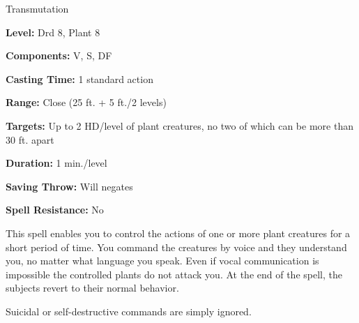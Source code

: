 
Transmutation

\textbf{Level:} Drd 8, Plant 8

\textbf{Components:} V, S, DF

\textbf{Casting Time:} 1 standard action

\textbf{Range:} Close (25 ft. + 5 ft./2 levels)

\textbf{Targets:} Up to 2 HD/level of plant creatures, no two of which can be more 
than 30 ft. apart

\textbf{Duration:} 1 min./level

\textbf{Saving Throw:} Will negates

\textbf{Spell Resistance:} No

This spell enables you to control the actions of one or more plant creatures for 
a short period of time. You command the creatures by voice and they understand 
you, no matter what language you speak. Even if vocal communication is impossible 
 the controlled plants do not attack you. At the end of the spell, the subjects 
revert to their normal behavior.

Suicidal or self-destructive commands are simply ignored.

